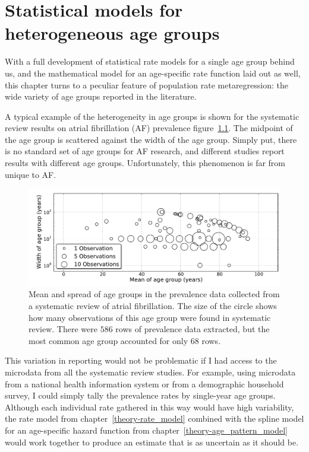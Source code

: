 \chapter{Statistical models for heterogeneous age groups}
\label{chap:age_group_model}
With a full development of statistical rate models for a single age group
behind us, and the mathematical model for an age-specific rate
function laid out as well, this chapter turns to a peculiar feature of
population rate metaregression: the wide variety of age groups reported
in the literature.

A typical example of the heterogeneity in age groups is shown for
the systematic review results on atrial fibrillation (AF)
prevalence\cite{TK_AF_report_reference}
figure~\ref{age-group-model-af-age-groups}.  The midpoint of the
age group is scattered against the width of the age group.  Simply put,
there is no standard set of age groups for AF research, and different
studies report results with different age groups. Unfortunately, this
phenomenon is far from unique to AF.

\begin{figure}[h]
\begin{center}
\includegraphics[width=\textwidth]{af_age_groups_scatter.pdf}
\end{center}
\caption[Mean and spread of age groups collected from a 
  systematic review of atrial fibrillation.]{Mean and spread 
  of age groups in the prevalence data
  collected from a systematic review of atrial fibrillation. The
  size of the circle shows how many observations of this age group
  were found in systematic review. There were
  $586$ rows of prevalence data
  extracted, but the most common age group accounted for only
  $68$ rows.}
\label{age-group-model-af-age-groups}
\end{figure}

This variation in reporting would not be problematic if I had access
to the microdata from all the systematic review studies.  For
example, using microdata from a national health information system or
from a demographic household survey, I could simply tally the
prevalence rates by single-year age groups.  Although each individual
rate gathered in this way would have high variability, the rate model
from chapter~\ref{theory-rate_model} combined with the spline model
for an age-specific hazard function from chapter~\ref{theory-age_pattern_model} would
work together to produce an estimate that is as uncertain as it should be.

